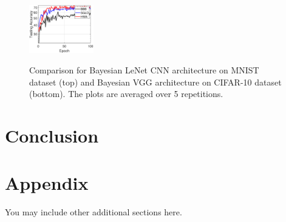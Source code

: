 \documentclass{article} %
\begin{document}
\begin{figure}[H]
{\includegraphics[width=0.25\textwidth]{newfigs/testacccifar.eps}
}
\caption{Comparison for Bayesian LeNet CNN architecture on MNIST dataset (top) and Bayesian VGG architecture on CIFAR-10 dataset (bottom). The plots are averaged over 5 repetitions.}
    \label{fig:all}
\end{figure}


\section{Conclusion}\label{sec:conclusion}

\newpage




\newpage
\appendix
\section{Appendix}
You may include other additional sections here. 
\end{document}
